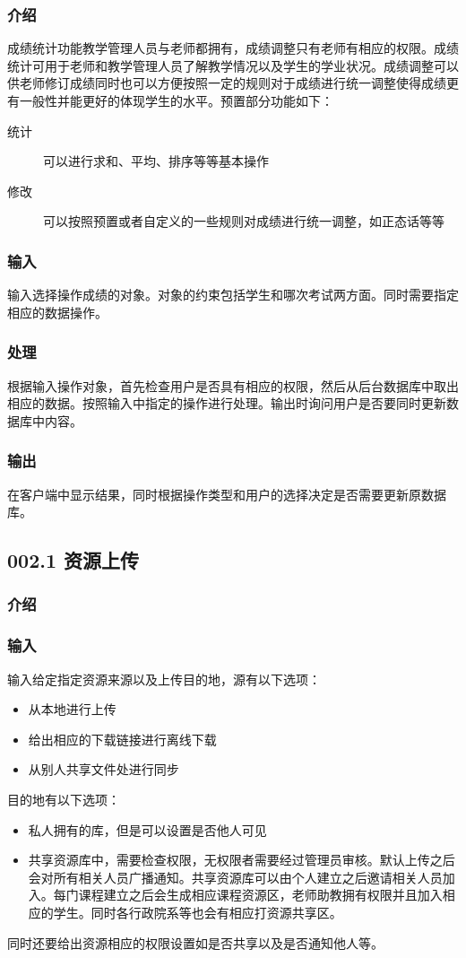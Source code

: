     \subsubsection{介绍}
    成绩统计功能教学管理人员与老师都拥有，成绩调整只有老师有相应的权限。成绩统计可用于老师和教学管理人员了解教学情况以及学生的学业状况。成绩调整可以供老师修订成绩同时也可以方便按照一定的规则对于成绩进行统一调整使得成绩更有一般性并能更好的体现学生的水平。预置部分功能如下：
    \begin{description}
      \item[统计] 可以进行求和、平均、排序等等基本操作
      \item[修改] 可以按照预置或者自定义的一些规则对成绩进行统一调整，如正态话等等
    \end{description}
    \subsubsection{输入}
    输入选择操作成绩的对象。对象的约束包括学生和哪次考试两方面。同时需要指定相应的数据操作。
    \subsubsection{处理}
    根据输入操作对象，首先检查用户是否具有相应的权限，然后从后台数据库中取出相应的数据。按照输入中指定的操作进行处理。输出时询问用户是否要同时更新数据库中内容。
    \subsubsection{输出}
    在客户端中显示结果，同时根据操作类型和用户的选择决定是否需要更新原数据库。


  \subsection{002.1 资源上传}
    \subsubsection{介绍}

    \subsubsection{输入}
    输入给定指定资源来源以及上传目的地，源有以下选项：
    \begin{itemize}
      \item 从本地进行上传
      \item 给出相应的下载链接进行离线下载
      \item 从别人共享文件处进行同步
    \end{itemize}
    目的地有以下选项：
    \begin{itemize}
      \item 私人拥有的库，但是可以设置是否他人可见
      \item 共享资源库中，需要检查权限，无权限者需要经过管理员审核。默认上传之后会对所有相关人员广播通知。共享资源库可以由个人建立之后邀请相关人员加入。每门课程建立之后会生成相应课程资源区，老师助教拥有权限并且加入相应的学生。同时各行政院系等也会有相应打资源共享区。
    \end{itemize}
    同时还要给出资源相应的权限设置如是否共享以及是否通知他人等。
